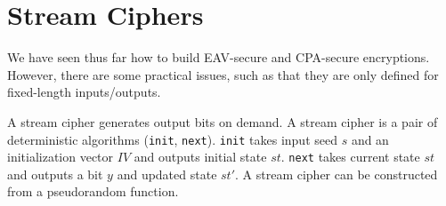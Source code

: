 \section{Stream Ciphers}

We have seen thus far how to build EAV-secure and CPA-secure 
encryptions. However, there are some practical issues, such 
as that they are only defined for fixed-length inputs/outputs. 

A stream cipher generates output bits on demand. A stream cipher 
is a pair of deterministic algorithms (\texttt{init}, \texttt{next}).
\texttt{init} takes input seed $s$ and an initialization vector $IV$ 
and outputs initial state $st$. \texttt{next} takes current state 
$st$ and outputs a bit $y$ and updated state $st'$. 
A stream cipher can be constructed from a pseudorandom function. 